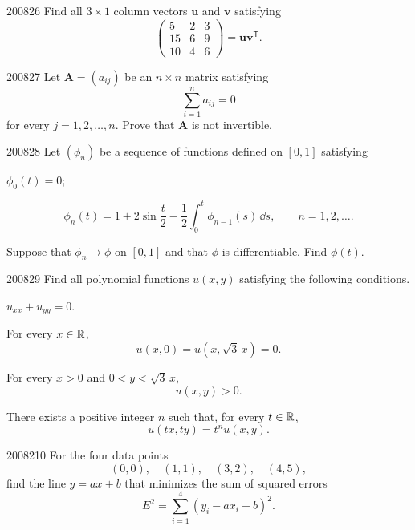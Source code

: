 \begin{problem}{2008}{2}{6}
Find all $3\times1$ column vectors $\mathbf u$ and $\mathbf v$ satisfying
\[
    \begin{pmatrix}
        5&2&3\\
        15&6&9\\
        10&4&6
    \end{pmatrix}
    =\mathbf u\mathbf v^{\mathsf T}.
\]
\end{problem}

\begin{problem}{2008}{2}{7}
Let $\mathbf A=(a_{ij})$ be an $n\times n$ matrix satisfying
\[
    \sum_{i=1}^{n}a_{ij}=0
\]
for every $j=1, 2, \dots, n$. Prove that $\mathbf A$ is not invertible.
\end{problem}

\begin{problem}{2008}{2}{8}
Let $(\phi_n)$ be a sequence of functions defined on $[0, 1]$ satisfying
\begin{problemsubparts}
    \item $\phi_0(t)=0$;
    \item
    \[
        \phi_n(t)
        =1+2\sin\frac t2
        -\frac12\int_0^t\phi_{n-1}(s)\, \dd s,
        \qquad n=1, 2, \dots.
    \]
\end{problemsubparts}
Suppose that $\phi_n\to\phi$ on $[0, 1]$ and that $\phi$ is differentiable. Find $\phi(t)$.
\end{problem}

\begin{problem}{2008}{2}{9}
Find all polynomial functions $u(x, y)$ satisfying the following conditions.
\begin{problemsubparts}
    \item $u_{xx}+u_{yy}=0$.
    \item For every $x\in\mathbb{R}$,
    \[
        u(x, 0)=u(x, \sqrt3\, x)=0.
    \]
    \item For every $x>0$ and $0<y<\sqrt3\, x$,
    \[
        u(x, y)>0.
    \]
    \item There exists a positive integer $n$ such that, for every $t\in\mathbb{R}$,
    \[
        u(tx, ty)=t^n u(x, y).
    \]
\end{problemsubparts}
\end{problem}

\begin{problem}{2008}{2}{10}
For the four data points
\[
    (0, 0), \quad(1, 1), \quad(3, 2), \quad(4, 5),
\]
find the line $y=ax+b$ that minimizes the sum of squared errors
\[
    E^2=\sum_{i=1}^{4}(y_i-ax_i-b)^2.
\]
\end{problem}

